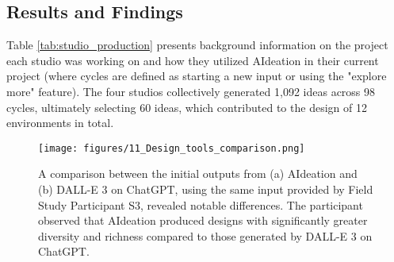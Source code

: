 \subsection{Results and Findings}

Table \ref{tab:studio_production} presents background information on the project each studio was working on and how they utilized AIdeation in their current project (where cycles are defined as starting a new input or using the "explore more" feature). The four studios collectively generated 1,092 ideas across 98 cycles, ultimately selecting 60 ideas, which contributed to the design of 12 environments in total.


\begin{figure*}
    \centering
    \texttt{[image: figures/11\_Design\_tools\_comparison.png]}
    \caption{A comparison between the initial outputs from (a) AIdeation and (b) DALL-E 3 on ChatGPT, using the same input provided by Field Study Participant S3, revealed notable differences. The participant observed that AIdeation produced designs with significantly greater diversity and richness compared to those generated by DALL-E 3 on ChatGPT.}
    \label{fig:design tool}
\end{figure*}


